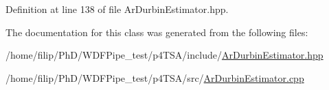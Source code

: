 Definition at line 138 of file Ar\+Durbin\+Estimator.\+hpp.



The documentation for this class was generated from the following files\+:\begin{DoxyCompactItemize}
\item 
/home/filip/\+Ph\+D/\+W\+D\+F\+Pipe\+\_\+test/p4\+T\+S\+A/include/\hyperlink{_ar_durbin_estimator_8hpp}{Ar\+Durbin\+Estimator.\+hpp}\item 
/home/filip/\+Ph\+D/\+W\+D\+F\+Pipe\+\_\+test/p4\+T\+S\+A/src/\hyperlink{_ar_durbin_estimator_8cpp}{Ar\+Durbin\+Estimator.\+cpp}\end{DoxyCompactItemize}

